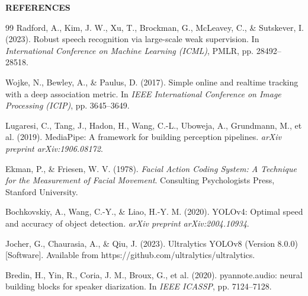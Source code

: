 \documentclass[12pt,a4paper,oneside]{report}
\begin{document}

\clearpage
{}
{}
\begin{center}
  {\fontsize{16}{19}\bfseries\MakeUppercase{References}\par}
\end{center}
\vspace{0.4cm}

\begin{thebibliography}{99}
Radford, A., Kim, J. W., Xu, T., Brockman, G., McLeavey, C., \& Sutskever, I. (2023). Robust speech recognition via large-scale weak supervision. In \textit{International Conference on Machine Learning (ICML)}, PMLR, pp. 28492--28518.

Wojke, N., Bewley, A., \& Paulus, D. (2017). Simple online and realtime tracking with a deep association metric. In \textit{IEEE International Conference on Image Processing (ICIP)}, pp. 3645--3649.

Lugaresi, C., Tang, J., Hadon, H., Wang, C.-L., Uboweja, A., Grundmann, M., et al. (2019). MediaPipe: A framework for building perception pipelines. \textit{arXiv preprint arXiv:1906.08172}.

Ekman, P., \& Friesen, W. V. (1978). \textit{Facial Action Coding System: A Technique for the Measurement of Facial Movement}. Consulting Psychologists Press, Stanford University.

Bochkovskiy, A., Wang, C.-Y., \& Liao, H.-Y. M. (2020). YOLOv4: Optimal speed and accuracy of object detection. \textit{arXiv preprint arXiv:2004.10934}.

Jocher, G., Chaurasia, A., \& Qiu, J. (2023). Ultralytics YOLOv8 (Version 8.0.0) [Software]. Available from https://github.com/ultralytics/ultralytics.

Bredin, H., Yin, R., Coria, J. M., Broux, G., et al. (2020). pyannote.audio: neural building blocks for speaker diarization. In \textit{IEEE ICASSP}, pp. 7124--7128.


\end{thebibliography}
\end{document}
